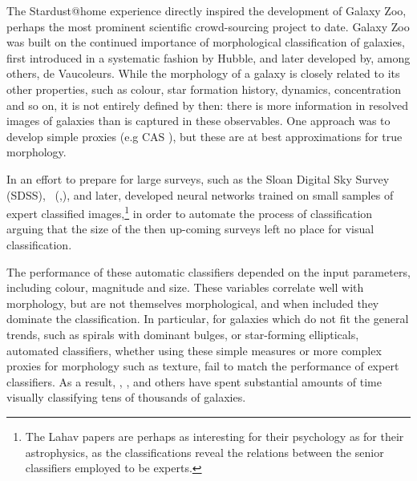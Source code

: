 \documentclass{ar2e}
\begin{document}



The Stardust@home experience directly inspired the development of Galaxy Zoo,
perhaps the most prominent scientific crowd-sourcing project to date. Galaxy Zoo
was built on the continued importance of morphological classification of
galaxies, first introduced in a systematic fashion by Hubble, and later
developed by, among others, de Vaucoleurs.  While the morphology of a galaxy is
closely related to its other properties, such as colour, star formation history,
dynamics, concentration and so on, it is not entirely defined by then: there is
more information in resolved images of galaxies than is captured in these
observables.  One approach was to develop simple proxies (e.g CAS \citep{Conselice}), but these
are at best approximations for true morphology. 

In an effort to prepare for large surveys, such as the Sloan
Digital Sky Survey (SDSS),
\citeauthor{Lahav1995}~(\citeyear{Lahav1995},\citeyear{Lahav1996}), and later,
\citet{Ball} developed neural networks trained on small samples of expert
classified images,\footnote{The Lahav papers are perhaps as interesting for
their psychology as for their astrophysics, as the classifications reveal the
relations between the senior classifiers employed to be experts.} in order to
automate the process of classification arguing that the size of the then
up-coming surveys left no place for visual classification.

The performance of these automatic classifiers depended on the input parameters,
including colour, magnitude and size. These variables correlate well with
morphology, but are not themselves morphological, and when included they
dominate the classification. In particular, for galaxies which do not fit the
general trends, such as spirals with dominant bulges, or star-forming
ellipticals, automated classifiers, whether using these simple measures or
more complex proxies for morphology such as texture, fail to match the
performance of expert classifiers\citet{Lin++2008}. As a result, \citet{Scha2007},
\citet{Nair}, and others have spent substantial amounts of time visually
classifying tens of thousands of galaxies. 
\end{document}
